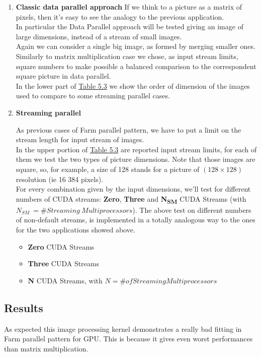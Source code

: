 \begin{enumerate}
	\item \textbf{Classic data parallel approach}
	If we think to a picture as a matrix of pixels, then it's easy to see the analogy to the previous application.\\
	In particular the Data Parallel approach will be tested giving an image of large dimensions, instead of a stream of small images.\\
	Again we can consider a single big image, as formed by merging smaller ones. Similarly to matrix multiplication case we chose, as input stream limits, square numbers to make possible a balanced comparison to the correspondent square picture in data parallel.\\
	In the lower part of \hyperref[tab:imgdata]{Table 5.3} we show the order of dimension of the images used to compare to some streaming parallel cases.
	
	\item \textbf{Streaming parallel}
	
	As previous cases of Farm parallel pattern, we have to put a limit on the stream length for input stream of images.\\
	In the upper portion of \hyperref[tab:imgdata]{Table 5.3} are reported input stream limits, for each of them we test the two types of picture dimensions. Note that those images are square, so, for example, a size of 128 stands for a picture of \((128\times128)\) resolution (ie 16 384 pixels).\\
	For every combination given by the input dimensions, we'll test for different numbers of CUDA streams: \textbf{Zero}, \textbf{Three} and \textbf{N\textsubscript{SM}} CUDA Streams (with \(N_{SM} \ =\# Streaming \ Multiprocessors\)).
	The above test on different numbers of non-default streams, is implemented in a totally analogous way to the ones for the two applications showed above.
	
	\begin{itemize}
		\item \textbf{Zero} CUDA Streams
		\item \textbf{Three} CUDA Streams
		\item \textbf{N} CUDA Streams, with \(N=\# of Streaming Multiprocessors\)
	\end{itemize}
\end{enumerate}



\subsection{Results}
As expected this image processing kernel demonstrates a really bad fitting in Farm parallel pattern for GPU. This is because it gives even worst performances than matrix multiplication.

